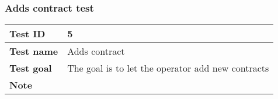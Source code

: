 {{		\subsubsection{Adds contract test}{
			\begin{table}[h]
			\begin{tabular}{|p{4cm}|p{10cm}|}
			\hline
				\centering \vspace{1mm} \bfseries{Test ID} \vspace{1mm} & 
				\vspace{1mm} 5 \vspace{1mm}\\
			\hline
				\centering \vspace{1mm} \bfseries{Test name} \vspace{1mm} & 
				\vspace{1mm} Adds contract\vspace{1mm}\\
			\hline
				\centering \vspace{1mm} \bfseries{Test goal} \vspace{1mm} & 
				\vspace{1mm} The goal is to let the operator add new contracts\vspace{1mm}\\
			\hline
				\centering \vspace{1mm} \bfseries{Note} \vspace{1mm} & 
				\vspace{1mm}  \vspace{1mm}\\
			\hline
			\end{tabular}
			\end{table}

}}}
